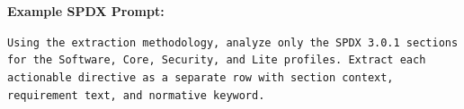 \noindent\textbf{Example SPDX Prompt:}
\begin{tcolorbox}[colback=gray!5!white, colframe=gray!50!black, boxrule=0.2pt]
\scriptsize
\texttt{Using the extraction methodology, analyze only the SPDX 3.0.1 sections for the Software, Core, Security, and Lite profiles. Extract each actionable directive as a separate row with section context, requirement text, and normative keyword.}
\end{tcolorbox}
